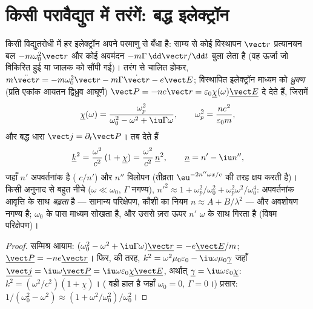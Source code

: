 \section{किसी परावैद्युत में तरंगें: बद्ध इलेक्ट्रॉन}

\begin{proposition}[प्रत्यास्थ रूप से बद्ध इलेक्ट्रॉन; सम्मिश्र अपवर्तनांक]\label{prop:b2:waves-in-media:lorentz}
किसी विद्युतरोधी में हर इलेक्ट्रॉन अपने परमाणु से बँधा है: साम्य से कोई विस्थापन
$\vect r$ प्रत्यानयन बल $-m\omega_0^2\vect r$ और कोई अवमंदन
$-m\Gamma\,\dd\vect r/\dd t$ बुला लेता है (वह ऊर्जा जो विकिरित हुई या जालक को सौंपी गई)।
तरंग से चालित होकर, $m\ddot{\vect r} = -m\omega_0^2\vect r - m\Gamma\dot{\vect r}
- e\vect E$; विस्थापित इलेक्ट्रॉन माध्यम को \emph{ध्रुवण}
(प्रति एकांक आयतन द्विध्रुव आघूर्ण) $\vect P = -ne\vect r = \varepsilon_0\underline\chi(\omega)
\underline{\vect E}$ दे देते हैं, जिसमें \emph{}
\[
\underline\chi(\omega) = \frac{\omega_p^2}{\omega_0^2 - \omega^2 + \iu\Gamma\omega} ,
\qquad \omega_p^2 = \frac{ne^2}{\varepsilon_0m} ,
\]
और बद्ध धारा $\vect j = \partial_t\vect P$। तब  देते हैं
\[
\underline k^2 = \frac{\omega^2}{c^2}\,(1 + \underline\chi) = \frac{\omega^2}{c^2}\,\underline n^2 ,
\qquad \underline n = n' - \iu n'' ,
\]
जहाँ $n'$ अपवर्तनांक है ( $c/n'$) और $n''$
विलोपन (तीव्रता $\eu^{-2n''\omega x/c}$ की तरह क्षय करती है)। किसी अनुनाद से
बहुत नीचे ($\omega \ll \omega_0$, $\Gamma$ नगण्य), $n'^2 \approx 1 + \omega_p^2/\omega_0^2 +
\omega_p^2\omega^2/\omega_0^4$: अपवर्तनांक आवृत्ति के साथ \emph{बढ़ता} है --- सामान्य
परिक्षेपण, कौशी का नियम $n \approx A + B/\lambda^2$ --- और अवशोषण
नगण्य है; $\omega_0$ के पास माध्यम सोखता है, और उससे ज़रा ऊपर $n'$
$\omega$ के साथ गिरता है (विषम परिक्षेपण)।
\end{proposition}

\begin{proof}
सम्मिश्र आयाम: $(\omega_0^2 - \omega^2 + \iu\Gamma\omega)\underline{\vect r} = -e\underline{\vect E}
/m$; $\underline{\vect P} = -ne\underline{\vect r}$। फिर,  की तरह, $k^2 = \omega^2\mu_0
\varepsilon_0 - \iu\omega\mu_0\underline\gamma$ जहाँ $\underline{\vect j} = \iu\omega\underline{\vect P} = \iu\omega\varepsilon_0
\underline\chi\underline{\vect E}$, अर्थात् $\underline\gamma = \iu\omega\varepsilon_0\underline\chi$: $k^2 = (\omega^2/c^2)
(1 + \underline\chi)$। ( वही हाल है जहाँ $\omega_0 = 0$, $\Gamma = 0$।)
प्रसार: $1/(\omega_0^2 - \omega^2) \approx (1 + \omega^2/\omega_0^2)/\omega_0^2$।
\end{proof}

